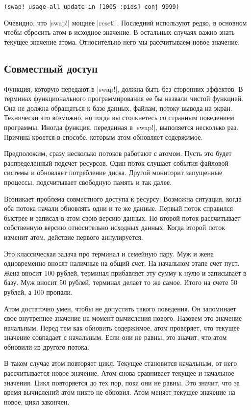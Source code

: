 \begin{verbatim}
(swap! usage-all update-in [1005 :pids] conj 9999)
\end{verbatim}

Очевидно, что \spverb|swap!| мощнее \spverb|reset!|. Последний используют редко, в основном
чтобы сбросить атом в исходное значение. В остальных случаях важно знать текущее
значение атома. Относительно него мы рассчитываем новое значение.

\subsection{Совместный доступ}

Функция, которую передают в \spverb|swap!|, должна быть без сторонних эффектов. В
терминах функционального программирования ее бы назвали чистой функцией. Она не
должна обращаться к базе данных, файлам, потоку вывода на экран. Технически это
возможно, но тогда вы столкнетесь со странным поведением программы. Иногда
функция, переданная в \spverb|swap!|, выполяется несколько раз. Причина кроется в
способе, которым атом обновляет содержимое.

Предположим, сразу несколько потоков работают с атомом. Пусть это будет
распределенный подсчет ресурсов. Один поток слушает события файловой системы и
обновляет потребление диска. Другой мониторит запущенные процессы, подсчитывает
свободную память и так далее.

Возникает проблема совместного доступа к ресурсу. Возможна ситуация, когда оба
потока начали обновлять одни и те же данные. Первый поток справился быстрее и
записал в атом свою версию данных. Но второй поток рассчитывает собственную
версию относительно исходных данных. Когда второй поток изменит атом, действие
первого аннулируется.

Это классическая задача про терминал и семейную пару. Муж и жена одновременно
вносят наличные на общий счет. На начальном этапе счет пуст. Жена вносит 100
рублей, терминал прибавляет эту сумму к нулю и записывает в базу. Муж вносит 50
рублей, терминал делает то же самое. Итого на счете 50 рублей, а 100 пропали.

Атом достаточно умен, чтобы не допустить такого поведения. Он запоминает свое
внутреннее значение на момент вычисления нового. Назовем это значение
начальным. Перед тем как обновить содержимое, атом проверяет, что текущее
значение совпадает с начальным. Если они не равны, это значит, что атом обновили
из другого потока.

В таком случае атом повторяет цикл. Текущее становится начальным, от него
рассчитывается новое значение. Атом снова сравнивает текущее и начальное
значения. Цикл повторяется до тех пор, пока они не равны. Это значит, что за
время вычислений атом никто не обновил. Атом меняет текущее значение на новое,
цикл закончен.

